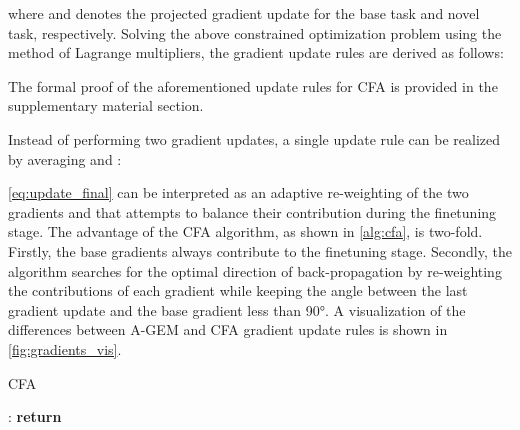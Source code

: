 \documentclass[10pt,twocolumn,letterpaper]{article}
\begin{document}
where  and  denotes the projected gradient update for the base task and novel task, respectively. Solving the above constrained optimization problem using the method of Lagrange multipliers, the gradient update rules are derived as follows: 

The formal proof of the aforementioned update rules for CFA is provided in the supplementary material section. 

Instead of performing two gradient updates, a single update rule can be realized by averaging  and :   

\cref{eq:update_final} can be interpreted as an adaptive re-weighting of the two gradients  and  that attempts to balance their contribution during the finetuning stage. The advantage of the CFA algorithm, as shown in \cref{alg:cfa}, is two-fold. Firstly, the base gradients always contribute to the finetuning stage. Secondly, the algorithm searches for the optimal direction of back-propagation by re-weighting the contributions of each gradient while keeping the angle between the last gradient update  and the base gradient  less than 90°. A visualization of the differences between A-GEM and CFA gradient update rules is shown in \cref{fig:gradients_vis}.  


\setlength{\textfloatsep}{15pt}\begin{algorithm}[t!]
\caption{CFA} \label{alg:cfa}
\footnotesize
\small
\begin{algorithmic}[1]
    \State 
            \For{}:
                        \State 
                        \State 
                        \State 
                        \If{}
                            \State 
                        \Else
                            \State 
                        \EndIf
                        \State 
                \EndFor
            \EndFor
    \State \textbf{return} 
  \EndProcedure
\end{algorithmic} 
\end{algorithm}
 
\end{document}
